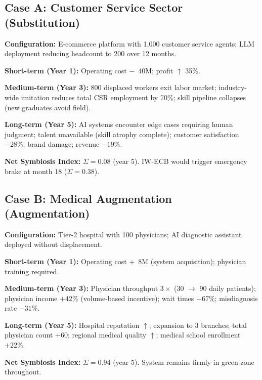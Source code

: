 \documentclass[conference]{IEEEtran}
\begin{document}
\subsection{Case A: Customer Service Sector (Substitution)}

\textbf{Configuration:} E-commerce platform with 1,000
customer service agents; LLM deployment reducing headcount
to 200 over 12 months.

\textbf{Short-term (Year 1):}
Operating cost $-$ \textyen\,40M; profit $\uparrow$ 35\%.

\textbf{Medium-term (Year 3):}
800 displaced workers exit labor market; industry-wide
imitation reduces total CSR employment by 70\%;
skill pipeline collapses (new graduates avoid field).

\textbf{Long-term (Year 5):}
AI systems encounter edge cases requiring human judgment;
talent unavailable (skill atrophy complete); customer
satisfaction $-28\%$; brand damage; revenue $-19\%$.

\textbf{Net Symbiosis Index:} $\Sigma = 0.08$ (year 5).
IW-ECB would trigger emergency brake at month 18
($\Sigma = 0.38$).

\subsection{Case B: Medical Augmentation (Augmentation)}

\textbf{Configuration:} Tier-2 hospital with 100
physicians; AI diagnostic assistant deployed without
displacement.

\textbf{Short-term (Year 1):}
Operating cost $+$ \textyen\,8M (system acquisition);
physician training required.

\textbf{Medium-term (Year 3):}
Physician throughput $3\times$ (30 $\to$ 90 daily patients);
physician income $+42\%$ (volume-based incentive);
wait times $-67\%$; misdiagnosis rate $-31\%$.

\textbf{Long-term (Year 5):}
Hospital reputation $\uparrow$; expansion to 3 branches;
total physician count $+$60; regional medical quality $\uparrow$;
medical school enrollment $+22\%$.

\textbf{Net Symbiosis Index:} $\Sigma = 0.94$ (year 5).
System remains firmly in green zone throughout.
\end{document}
